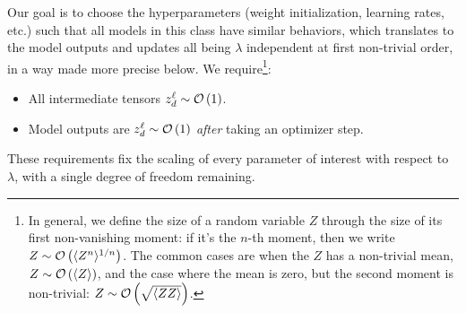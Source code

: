 Our goal is to choose the hyperparameters (weight initialization, learning rates, etc.) such that
all models in this class have similar behaviors, which translates to the model outputs and updates
all being $ \lambda  $ independent at first non-trivial order, in a way made more precise below. We
require\footnote{In general, we define the size of a random variable $ Z $ through the size of its first
non-vanishing moment: if it's the $ n $-th moment, then we write $ Z \sim \mathcal{O} \left( \langle Z^{ n
} \rangle^{1/n} \right)$. The common cases are when the $ Z $ has a non-trivial mean,  $ Z \sim
\mathcal{O} \left( \langle Z \rangle \right)$, and the case where the mean is zero, but the second moment
is non-trivial: $ Z \sim \mathcal{O} \left( \sqrt{\langle Z Z \rangle} \right)$.}:
\begin{itemize}
    \item All intermediate tensors $ z ^{ \ell }  _{d  } \sim \mathcal{O} \left( 1 \right)  $.
    \item Model outputs are $ z ^{ \ell } _{ d } \sim \mathcal{O} \left( 1 \right)  $ \textit{after}
        taking an optimizer step.
\end{itemize}
 These requirements fix the scaling of every parameter of interest with respect
to $ \lambda  $, with a single degree of freedom remaining.

